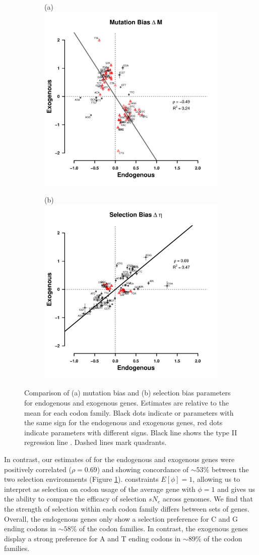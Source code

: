 \documentclass[fleqn,letterpaper]{article}
\begin{document}
\begin{figure}
    \centering
    \begin{subfigure}
        \centering
        (a) \includegraphics[width=.45\textwidth]{img/csp_corr_dm.pdf}
    \end{subfigure}
    \begin{subfigure}
        \centering
        (b) \includegraphics[width=.45\textwidth]{img/csp_corr_deta.pdf}
    \end{subfigure}
    \caption{Comparison of (a) mutation bias \DM and (b) selection bias \DE parameters for endogenous and exogenous genes.
      Estimates are relative to the mean for each codon family.
      Black dots indicate \DM or \DE parameters with the same sign for the endogenous and exogenous genes, red dots indicate parameters with different signs.
      Black line shows the type II regression line \citep{SokalAndRohlf1981}.
      Dashed lines mark quadrants.}
    \label{fig:csp_comp}
\end{figure}

In contrast, our estimates of \DE for the endogenous and exogenous genes were positively correlated ($\rho = 0.69$) and showing concordance of $\sim53\%$ between the two selection environments (Figure \ref{fig:csp_comp}).
\ROC constraints $E[\phi] = 1$, allowing us to interpret \DE as selection on codon usage of the average gene with $\phi = 1$ and gives us the ability to compare the efficacy of selection $sN_e$  across genomes.
We find that the strength of selection within each codon family differs between sets of genes.
Overall, the endogenous genes only show a selection preference for C and G ending codons in $\sim58\%$ of the codon families.
In contrast, the exogenous genes display a strong preference for A and T ending codons in $\sim89\%$ of the codon families.
\end{document}
